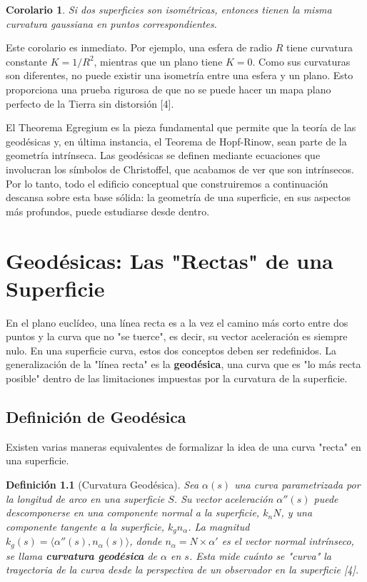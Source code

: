 \documentclass[12pt, a4paper]{report}
\theoremstyle{miestilo}
\newtheorem{corolario}[teorema]{Corolario}
\theoremstyle{midefinicion}
\newtheorem{definicion}[teorema]{Definición}
\begin{document}
\begin{corolario}
Si dos superficies son isométricas, entonces tienen la misma curvatura gaussiana en puntos correspondientes.
\end{corolario}

Este corolario es inmediato. Por ejemplo, una esfera de radio $R$ tiene curvatura constante $K = 1/R^2$, mientras que un plano tiene $K=0$. Como sus curvaturas son diferentes, no puede existir una isometría entre una esfera y un plano. Esto proporciona una prueba rigurosa de que no se puede hacer un mapa plano perfecto de la Tierra sin distorsión [4].

El Theorema Egregium es la pieza fundamental que permite que la teoría de las geodésicas y, en última instancia, el Teorema de Hopf-Rinow, sean parte de la geometría intrínseca. Las geodésicas se definen mediante ecuaciones que involucran los símbolos de Christoffel, que acabamos de ver que son intrínsecos. Por lo tanto, todo el edificio conceptual que construiremos a continuación descansa sobre esta base sólida: la geometría de una superficie, en sus aspectos más profundos, puede estudiarse desde dentro.

\chapter{Geodésicas: Las "Rectas" de una Superficie}

En el plano euclídeo, una línea recta es a la vez el camino más corto entre dos puntos y la curva que no "se tuerce", es decir, su vector aceleración es siempre nulo. En una superficie curva, estos dos conceptos deben ser redefinidos. La generalización de la "línea recta" es la \textbf{geodésica}, una curva que es "lo más recta posible" dentro de las limitaciones impuestas por la curvatura de la superficie.

\section{Definición de Geodésica}

Existen varias maneras equivalentes de formalizar la idea de una curva "recta" en una superficie.

\begin{definicion}[Curvatura Geodésica]
Sea $\alpha(s)$ una curva parametrizada por la longitud de arco en una superficie $S$. Su vector aceleración $\alpha''(s)$ puede descomponerse en una componente normal a la superficie, $k_n N$, y una componente tangente a la superficie, $k_g n_\alpha$. La magnitud $k_g(s) = \langle \alpha''(s), n_\alpha(s) \rangle$, donde $n_\alpha = N \times \alpha'$ es el vector normal intrínseco, se llama \textbf{curvatura geodésica} de $\alpha$ en $s$. Esta mide cuánto se "curva" la trayectoria de la curva desde la perspectiva de un observador en la superficie [4].
\end{definicion}
\end{document}
